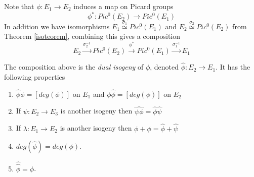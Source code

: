 Note that $\phi: E_1 \rightarrow E_2$ induces a map on Picard groups
$$\phi^*: Pic^0(E_2) \rightarrow Pic^0(E_1)$$
In addition we have isomorphisms $E_1 \overset{\sigma_1}{\simeq} Pic^0(E_1)$ and 
$E_2 \overset{\sigma_2}{\simeq} Pic^0(E_2)$ from Theorem \ref{isoteorem}, combining this gives a composition
$$ E_2 \overset{\sigma_2^{-1}}{\rightarrow} Pic^0(E_2) \overset{\phi^*}{\rightarrow} Pic^0(E_1)
\overset{\sigma_1^{-1}}{\rightarrow} E_1 $$

\begin{prop}
 The composition above is the \emph{dual isogeny} of $\phi$, denoted $\widehat{\phi}: E_2 \rightarrow E_1$.
It has the following properties 
\begin{enumerate}
 \item $\widehat{\phi}\phi = [deg(\phi)]$ on $E_1$ and $\phi\widehat{\phi} = [deg(\phi)]$ on $E_2$
 \item If $\psi: E_2 \rightarrow E_3$ is another isogeny then $\widehat{\psi \phi} = \widehat{\phi}\widehat{\psi}$
 \item If $\lambda: E_1 \rightarrow E_2$ is another isogeny then $\widehat{\phi+\phi} = \widehat{\phi}+\widehat{\psi}$
 \item $deg(\widehat{\phi}) = deg(\phi)$.
 \item $\widehat{\widehat{\phi}} = \phi$.
\end{enumerate}
\end{prop}

